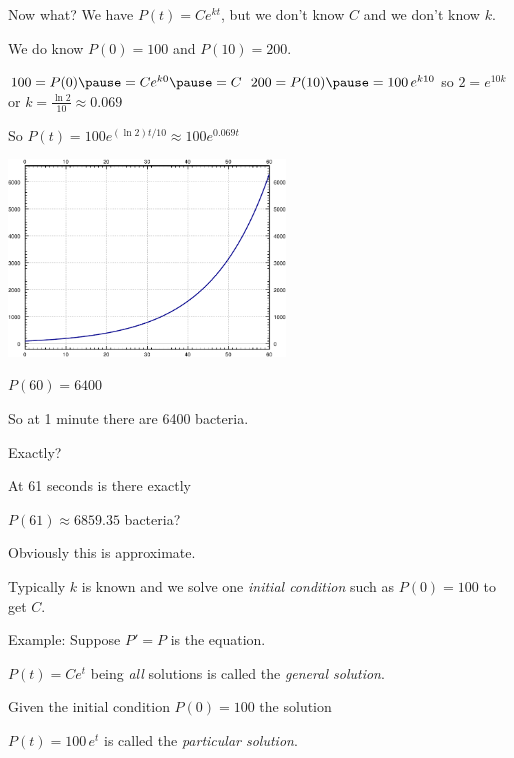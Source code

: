 \documentclass[10pt,aspectratio=169]{beamer}
\begin{document}
\begin{frame}

Now what?  We have $P(t) = C e^{kt}$, but we don't know $C$ and we don't know $k$.

\medskip
\pause

We do know $P(0)=100$ and $P(10)=200$.

\medskip
\pause

$100 = P(0) \pause = C e^{k0} \pause = C$
\pause
\qquad
$200 = P(10) \pause = 100 \, e^{k10}$
\qquad
so
\quad
$2 = e^{10k}$ \pause or $k = \frac{\ln 2}{10} \approx 0.069$ 

\medskip
\pause

So
\quad
$P(t)=100e^{(\ln 2)t/10} \approx 100e^{0.069 t}$

\pause

\vspace*{-0.2in}

\hspace*{2.5in}
\includegraphics[width=2.9in]{../figures/intro-plotbact}

\vspace*{-1.8in}
\pause

$P(60) = 6400$

\pause

So at 1 minute there are 6400 bacteria.

\pause
\medskip

Exactly?

\pause
\medskip

At 61 seconds is there exactly

$P(61)\approx 6859.35$ bacteria?

\medskip
\pause

Obviously this is approximate.

\end{frame}

\begin{frame}

Typically $k$ is known and we solve one
\emph{initial condition} such as
$P(0)=100$ to get $C$.

\medskip
\pause

Example: Suppose $P' = P$ is the equation.

\medskip
\pause

$P(t) = C e^{t}$ \quad being \emph{all} solutions is called the
\emph{general solution}.

\medskip
\pause

Given the initial condition $P(0) = 100$ the solution

\medskip

$P(t) = 100 \, e^{t}$ \quad is called the \emph{particular solution}.

\end{frame}
\end{document}
